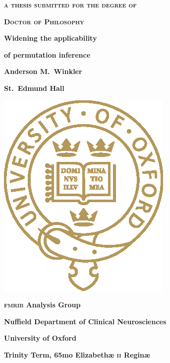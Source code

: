 \pagestyle{empty}
\begin{center}
\textbf{\textsc{a thesis submitted for the degree of}}

\textbf{\textsc{Doctor of Philosophy}}

\vspace*{\fill}

\begin{Huge}
{\color{oxblue}\textbf{Widening the applicability}}
\end{Huge}

\vspace{2mm}

\begin{Huge}
{\color{oxblue}\textbf{of permutation inference}}
\end{Huge}

\vspace*{\fill}

\textbf{Anderson M.\ Winkler}

\textbf{St.\ Edmund Hall}

\vspace*{\fill}

\includegraphics[scale=1.6]{figures/ox_logo_special_gold_pos.eps}

\vspace*{\fill}

\textbf{\textsc{fmrib} Analysis Group}

\textbf{Nuffield Department of Clinical Neurosciences}

\textbf{University of Oxford}

\vspace*{\fill}

\textbf{Trinity Term, 65mo Elizabeth\ae{} \textsc{ii} Regin\ae{}}
\end{center}

